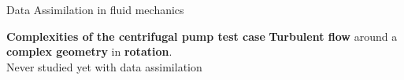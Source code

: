 \documentclass[10pt, aspectratio=169, dvipsnames]{beamer}
\begin{document}
\begin{frame}{Data Assimilation in fluid mechanics}
        \centering
        \begin{block}{\textbf{Complexities of the centrifugal pump test case}}
            \textbf{Turbulent flow} around a \textbf{complex geometry} in \textbf{rotation}. \\
            \vspace{0.2cm}
            \alert{Never studied yet with data assimilation}
        \end{block}
            

    \end{frame}
\end{document}
